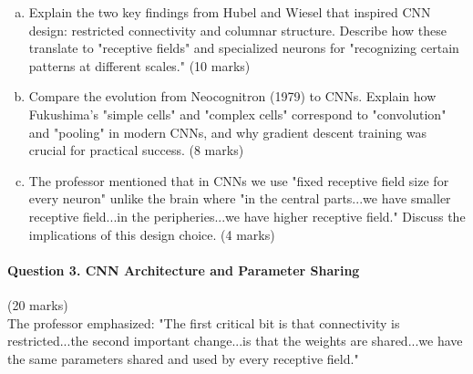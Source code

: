 \documentclass[12pt]{article}
\newcommand{\shortanswer}{\vspace{2cm}}
\newcommand{\mediumanswer}{\vspace{3cm}}
\begin{document}
\begin{enumerate}[(a)]
    \item Explain the two key findings from Hubel and Wiesel that inspired CNN design: restricted connectivity and columnar structure. Describe how these translate to "receptive fields" and specialized neurons for "recognizing certain patterns at different scales." \hfill (10 marks)
    
    \mediumanswer
    
    \item Compare the evolution from Neocognitron (1979) to CNNs. Explain how Fukushima's "simple cells" and "complex cells" correspond to "convolution" and "pooling" in modern CNNs, and why gradient descent training was crucial for practical success. \hfill (8 marks)
    
    \mediumanswer
    
    \item The professor mentioned that in CNNs we use "fixed receptive field size for every neuron" unlike the brain where "in the central parts...we have smaller receptive field...in the peripheries...we have higher receptive field." Discuss the implications of this design choice. \hfill (4 marks)
    
    \shortanswer
\end{enumerate}

\newpage
\paragraph{Question 3. CNN Architecture and Parameter Sharing}{\hfill (20 marks)}\\
The professor emphasized: "The first critical bit is that connectivity is restricted...the second important change...is that the weights are shared...we have the same parameters shared and used by every receptive field."
\end{document}
